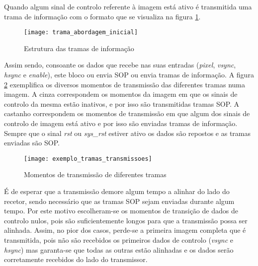 Quando algum sinal de controlo referente à imagem está ativo é transmitida uma trama de informação com o formato que se visualiza na figura \ref{fig:trama_abordagem_inicial}.

\begin{figure}[h!]
	\begin{center}
		\leavevmode
		\texttt{[image: trama\_abordagem\_inicial]}
		\captionsetup{width=1.0\linewidth}
		\caption[Estrutura das tramas de informação]{Estrutura das tramas de informação}
		\label{fig:trama_abordagem_inicial}
	\end{center}
\end{figure}

Assim sendo, consoante os dados que recebe nas suas entradas (\textit{pixel}, \textit{vsync}, \textit{hsync} e \textit{enable}), este bloco ou envia SOP ou envia tramas de informação. A figura \ref{fig:momentos_tramas} exemplifica os diversos momentos de transmissão das diferentes tramas numa imagem. A cinza correspondem os momentos da imagem em que os sinais de controlo da mesma estão inativos, e por isso são transmitidas tramas SOP. A castanho correspondem os momentos de transmissão em que algum dos sinais de controlo de imagem está ativo e por isso são enviadas tramas de informação. Sempre que o sinal \textit{rst} ou \textit{sys\_rst} estiver ativo os dados são repostos e as tramas enviadas são SOP. 

\begin{figure}[h!]
	\begin{center}
		\leavevmode
		\texttt{[image: exemplo\_tramas\_transmissoes]}
		\captionsetup{width=1.0\linewidth}
		\caption[Momentos de transmissão de diferentes tramas]{Momentos de transmissão de diferentes tramas}
		\label{fig:momentos_tramas}
	\end{center}
\end{figure}

É de esperar que a transmissão demore algum tempo a alinhar do lado do recetor, sendo necessário que as tramas SOP sejam enviadas durante algum tempo. Por este motivo escolheram-se os momentos de transição de dados de controlo nulos, pois são suficientemente longos para que a transmissão possa ser alinhada. Assim, no pior dos casos, perde-se a primeira imagem completa que é transmitida, pois não são recebidos os primeiros dados de controlo (\textit{vsync} e \textit{hsync}) mas garanta-se que todas as outras estão alinhadas e os dados serão corretamente recebidos do lado do transmissor.

